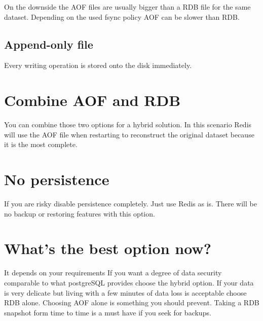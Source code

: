 On the downside the AOF files are usually bigger than a RDB file for the same dataset. Depending on the used fsync policy AOF can be slower than RDB.

\subsection{Append-only file}
Every writing operation is stored onto the disk immediately.

\section{Combine AOF and RDB}
You can combine those two options for a hybrid solution. In this scenario Redis will use the AOF file when restarting to reconstruct the original dataset because it is the most complete.

\section{No persistence}
If you are risky disable persistence completely. Just use Redis as is. There will be no backup or restoring features with this option.

\section{What's the best option now?}
It depends on your requirements If you want a degree of data security comparable to what postgreSQL provides choose the hybrid option.
If your data is very delicate but living with a few minutes of data loss is acceptable choose RDB alone.
Choosing AOF alone is something you should prevent. Taking a RDB snapshot form time to time is a must have if you seek for backups.
